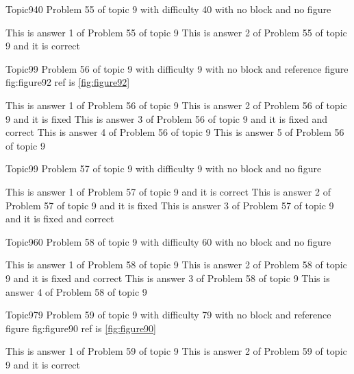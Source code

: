 \documentclass[master]{exam}
\begin{document}
\begin{problem}{Topic9}{40}
	Problem 55 of topic 9 with difficulty 40 with no block and no figure
	\begin{answers}
		\answer This is answer 1 of Problem 55 of topic 9 
		\answer[correct] This is answer 2 of Problem 55 of topic 9 and it is correct
	\end{answers}
\end{problem}

\begin{problem}{Topic9}{9}
	Problem 56 of topic 9 with difficulty 9 with no block and reference figure fig:figure92 ref is \ref{fig:figure92}
	\begin{answers}
		\answer This is answer 1 of Problem 56 of topic 9 
		\answer[fixed] This is answer 2 of Problem 56 of topic 9 and it is fixed
		 This is answer 3 of Problem 56 of topic 9 and it is fixed and correct
		\answer This is answer 4 of Problem 56 of topic 9 
		\answer This is answer 5 of Problem 56 of topic 9 
	\end{answers}
\end{problem}

\begin{problem}{Topic9}{9}
	Problem 57 of topic 9 with difficulty 9 with no block and no figure
	\begin{answers}
		\answer[correct] This is answer 1 of Problem 57 of topic 9 and it is correct
		\answer[fixed] This is answer 2 of Problem 57 of topic 9 and it is fixed
		 This is answer 3 of Problem 57 of topic 9 and it is fixed and correct
	\end{answers}
\end{problem}

\begin{problem}{Topic9}{60}
	Problem 58 of topic 9 with difficulty 60 with no block and no figure
	\begin{answers}
		\answer This is answer 1 of Problem 58 of topic 9 
		 This is answer 2 of Problem 58 of topic 9 and it is fixed and correct
		\answer This is answer 3 of Problem 58 of topic 9 
		\answer This is answer 4 of Problem 58 of topic 9 
	\end{answers}
\end{problem}

\begin{problem}{Topic9}{79}
	Problem 59 of topic 9 with difficulty 79 with no block and reference figure fig:figure90 ref is \ref{fig:figure90}
	\begin{answers}
		\answer This is answer 1 of Problem 59 of topic 9 
		\answer[correct] This is answer 2 of Problem 59 of topic 9 and it is correct
	\end{answers}
\end{problem}
\end{document}
